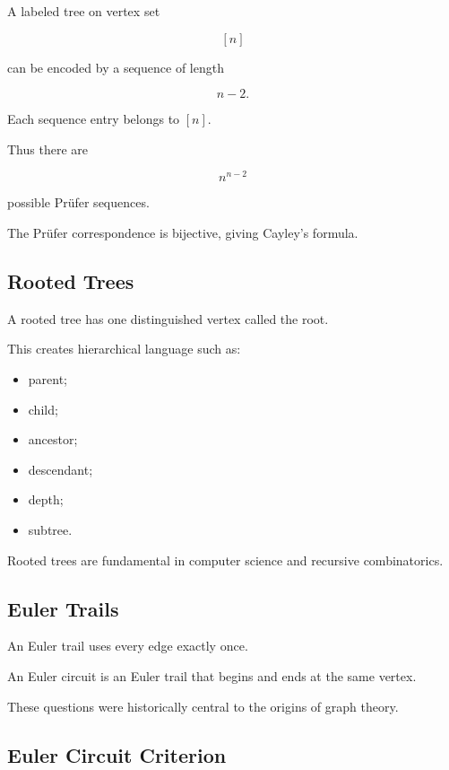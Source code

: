 A labeled tree on vertex set

\[
[n]
\]

can be encoded by a sequence of length

\[
n-2.
\]

Each sequence entry belongs to \([n]\).

Thus there are

\[
n^{n-2}
\]

possible Prüfer sequences.

The Prüfer correspondence is bijective, giving Cayley's formula.

\subsection{Rooted Trees}
\label{subsec:rooted-trees}

A rooted tree has one distinguished vertex called the root.

This creates hierarchical language such as:

\begin{itemize}
    \item parent;
    \item child;
    \item ancestor;
    \item descendant;
    \item depth;
    \item subtree.
\end{itemize}

Rooted trees are fundamental in computer science and recursive
combinatorics.

\subsection{Euler Trails}
\label{subsec:euler-trails}

An Euler trail uses every edge exactly once.

An Euler circuit is an Euler trail that begins and ends at the same
vertex.

These questions were historically central to the origins of graph
theory.

\subsection{Euler Circuit Criterion}
\label{subsec:euler-circuit-criterion}

